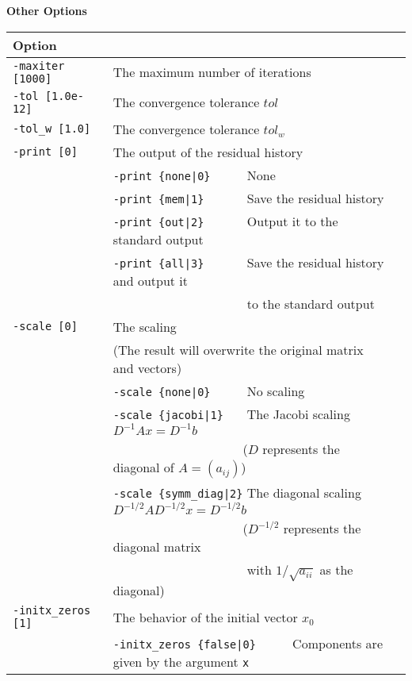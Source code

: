 \documentclass[a4paper]{article}
\begin{document}
\begin{minipage}[t]{\textwidth}
\begin{center}
{\bf Other Options}\\
\begin{tabular}{l|ll}\hline\hline
Option &                          \\ \hline
\verb=-maxiter [1000]= & The maximum number of iterations         \\ 
\verb=-tol [1.0e-12]=  & The convergence tolerance $tol$            \\
\verb=-tol_w [1.0]=    & The convergence tolerance $tol_w$  \\
\verb=-print [0]=      & The output of the residual history                \\
                       & \verb=-print {none|0}     =  None \\
                       & \verb=-print {mem|1}      =  Save the residual history\\
                       & \verb=-print {out|2}      =  Output it to the standard output\\
                       & \verb=-print {all|3}      =  Save the residual history and output it \\ 
                       & \verb=                    =  to the standard output \\
\verb=-scale [0]=      & The scaling \\
                       & (The result will overwrite the original matrix and vectors) \\
                       & \verb=-scale {none|0}     =  No scaling \\ 
                       & \verb=-scale {jacobi|1}   =  The Jacobi scaling $D^{-1}Ax=D^{-1}b$ \\
                       & \verb=                    =  ($D$ represents the diagonal of $A=(a_{ij})$)\\
                       & \verb=-scale {symm_diag|2}=  The diagonal scaling $D^{-1/2}AD^{-1/2}x=D^{-1/2}b$ \\
                       & \verb=                    =  ($D^{-1/2}$ represents the diagonal matrix \\
                       & \verb=                    =  with $1/\sqrt{a_{ii}}$ as the diagonal) \\ 
\verb=-initx_zeros [1]= & The behavior of the initial vector $x_{0}$  \\
                       & \verb=-initx_zeros {false|0}     =  Components are given by the argument \verb=x= \\

\end{tabular}
\end{center}
\end{minipage}
\end{document}
